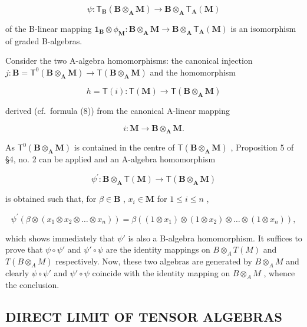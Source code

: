 \[
\psi : \mathsf {T} _ {\mathbf {B}} (\mathbf {B} \otimes_ {\mathbf {A}} \mathbf {M}) \rightarrow \mathbf {B} \otimes_ {\mathbf {A}} \mathsf {T} _ {\mathbf {A}} (\mathbf {M})
\]

of the B-linear mapping \(\mathbf{1}_{\mathbf{B}} \otimes \phi_{\mathbf{M}}: \mathbf{B} \otimes_{\mathbf{A}} \mathbf{M} \to \mathbf{B} \otimes_{\mathbf{A}} \mathsf{T}_{\mathbf{A}}(\mathbf{M})\) is an isomorphism of graded B-algebras.

Consider the two A-algebra homomorphisms: the canonical injection \(j: \mathbf{B} = \mathsf{T}^0(\mathbf{B} \otimes_{\mathbf{A}} \mathbf{M}) \to \mathsf{T}(\mathbf{B} \otimes_{\mathbf{A}} \mathbf{M})\) and the homomorphism

\[
h = \mathsf {T} (i): \mathsf {T} (\mathbf {M}) \rightarrow \mathsf {T} (\mathbf {B} \otimes_ {\mathbf {A}} \mathbf {M})
\]

derived (cf.~formula (8)) from the canonical A-linear mapping

\[
i: \mathbf {M} \rightarrow \mathbf {B} \otimes_ {\mathbf {A}} \mathbf {M}.
\]

As \(\mathsf{T}^0 (\mathbf{B}\otimes_{\mathbf{A}}\mathbf{M})\) is contained in the centre of \(\mathsf{T}(\mathbf{B}\otimes_{\mathbf{A}}\mathbf{M})\) , Proposition 5 of §4, no. 2 can be applied and an A-algebra homomorphism

\[
\psi^ {\prime}: \mathbf {B} \otimes_ {\mathbf {A}} \mathsf {T} (\mathbf {M}) \rightarrow \mathsf {T} (\mathbf {B} \otimes_ {\mathbf {A}} \mathbf {M})
\]

is obtained such that, for \(\beta \in \mathbf{B}\) , \(x_{i} \in \mathbf{M}\) for \(1 \leqslant i \leqslant n\) ,

\[
\psi^ {\prime} (\beta \otimes (x _ {1} \otimes x _ {2} \otimes \dots \otimes x _ {n})) = \beta ((1 \otimes x _ {1}) \otimes (1 \otimes x _ {2}) \otimes \dots \otimes (1 \otimes x _ {n})),
\]

which shows immediately that \(\psi'\) is also a B-algebra homomorphism. It suffices to prove that \(\psi \circ \psi'\) and \(\psi' \circ \psi\) are the identity mappings on \(B \otimes_{A} T(M)\) and \(T(B \otimes_{A} M)\) respectively. Now, these two algebras are generated by \(B \otimes_{A} M\) and clearly \(\psi \circ \psi'\) and \(\psi' \circ \psi\) coincide with the identity mapping on \(B \otimes_{A} M\) , whence the conclusion.

\subsection{DIRECT LIMIT OF TENSOR ALGEBRAS}

